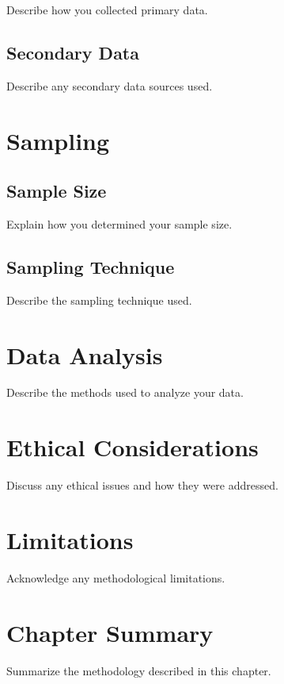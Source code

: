Describe how you collected primary data.

\subsection{Secondary Data}

Describe any secondary data sources used.

\section{Sampling}

\subsection{Sample Size}

Explain how you determined your sample size.

\subsection{Sampling Technique}

Describe the sampling technique used.

\section{Data Analysis}

Describe the methods used to analyze your data.

\section{Ethical Considerations}

Discuss any ethical issues and how they were addressed.

\section{Limitations}

Acknowledge any methodological limitations.

\section{Chapter Summary}

Summarize the methodology described in this chapter.
